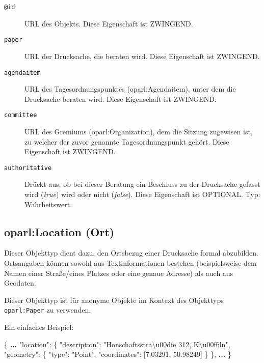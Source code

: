\documentclass[,a4paper]{article}
\newenvironment{Shaded}{}{}
\newcommand{\DataTypeTok}[1]{\textcolor[rgb]{0.56,0.13,0.00}{{#1}}}
\newcommand{\FloatTok}[1]{\textcolor[rgb]{0.25,0.63,0.44}{{#1}}}
\newcommand{\StringTok}[1]{\textcolor[rgb]{0.25,0.44,0.63}{{#1}}}
\newcommand{\ErrorTok}[1]{\textcolor[rgb]{1.00,0.00,0.00}{\textbf{{#1}}}}
\newcommand{\NormalTok}[1]{{#1}}
\begin{document}
\begin{description}
\item[\texttt{@id}]
URL des Objekts. Diese Eigenschaft ist ZWINGEND.
\item[\texttt{paper}]
URL der Drucksache, die beraten wird. Diese Eigenschaft ist ZWINGEND.
\item[\texttt{agendaitem}]
URL des Tagesordnungspunktes (oparl:Agendaitem), unter dem die
Drucksache beraten wird. Diese Eigenschaft ist ZWINGEND.
\item[\texttt{committee}]
URL des Gremiums (oparl:Organization), dem die Sitzung zugewisen ist, zu
welcher der zuvor genannte Tagesordnungspunkt gehört. Diese Eigenschaft
ist ZWINGEND.
\item[\texttt{authoritative}]
Drückt aus, ob bei dieser Beratung ein Beschluss zu der Drucksache
gefasst wird (\emph{true}) wird oder nicht (\emph{false}). Diese
Eigenschaft ist OPTIONAL. Typ: Wahrheitswert.
\end{description}

\subsection{oparl:Location (Ort)}\label{oparlux5flocation}

Dieser Objekttyp dient dazu, den Ortsbezug einer Drucksache formal
abzubilden. Ortsangaben können sowohl aus Textinformationen bestehen
(beispielsweise dem Namen einer Straße/eines Platzes oder eine genaue
Adresse) als auch aus Geodaten.

Dieser Objekttyp ist für anonyme Objekte im Kontext des Objekttyps
\texttt{oparl:Paper} zu verwenden.

Ein einfaches Beispiel:

\begin{Shaded}
\begin{Highlighting}[]
\NormalTok{\{}
    \ErrorTok{...}
    \DataTypeTok{"location"}\NormalTok{: \{}
        \DataTypeTok{"description"}\NormalTok{: }\StringTok{"Honschaftsstra\textbackslash{}u00dfe 312, K\textbackslash{}u00f6ln"}\NormalTok{,}
        \DataTypeTok{"geometry"}\NormalTok{: \{}
            \DataTypeTok{"type"}\NormalTok{: }\StringTok{"Point"}\NormalTok{,}
            \DataTypeTok{"coordinates"}\NormalTok{: [}\FloatTok{7.03291}\NormalTok{, }\FloatTok{50.98249}\NormalTok{]}
        \NormalTok{\}}
    \NormalTok{\},}
    \ErrorTok{...}
\NormalTok{\}}
\end{Highlighting}
\end{Shaded}
\end{document}
